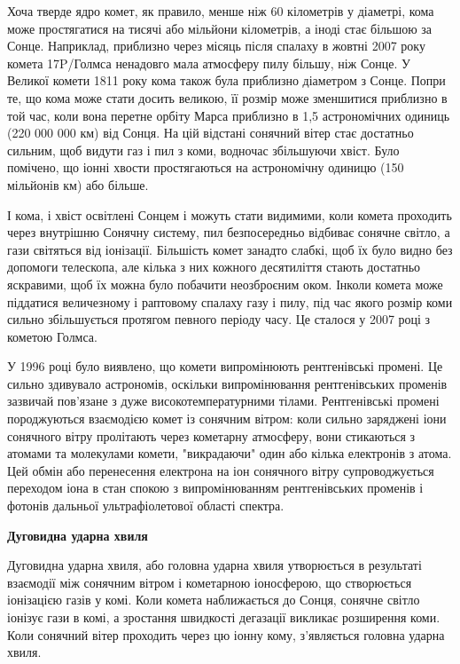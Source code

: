 \documentclass[a4paper]{article}
\begin{document}
    Хоча тверде ядро комет, як правило, менше ніж 60 кілометрів у діаметрі, кома може простягатися на тисячі або мільйони кілометрів, а іноді стає більшою за Сонце. Наприклад, приблизно через місяць після спалаху в жовтні 2007 року комета 17P/Голмса ненадовго мала атмосферу пилу більшу, ніж Сонце. У Великої комети 1811 року кома також була приблизно діаметром з Сонце. Попри те, що кома може стати досить великою, її розмір може зменшитися приблизно в той час, коли вона перетне орбіту Марса приблизно в 1,5 астрономічних одиниць (220 000 000 км) від Сонця. На цій відстані сонячний вітер стає достатньо сильним, щоб видути газ і пил з коми, водночас збільшуючи хвіст. Було помічено, що іонні хвости простягаються на астрономічну одиницю (150 мільйонів км) або більше.
    
    І кома, і хвіст освітлені Сонцем і можуть стати видимими, коли комета проходить через внутрішню Сонячну систему, пил безпосередньо відбиває сонячне світло, а гази світяться від іонізації. Більшість комет занадто слабкі, щоб їх було видно без допомоги телескопа, але кілька з них кожного десятиліття стають достатньо яскравими, щоб їх можна було побачити неозброєним оком. Інколи комета може піддатися величезному і раптовому спалаху газу і пилу, під час якого розмір коми сильно збільшується протягом певного періоду часу. Це сталося у 2007 році з кометою Голмса.
    
    У 1996 році було виявлено, що комети випромінюють рентгенівські промені. Це сильно здивувало астрономів, оскільки випромінювання рентгенівських променів зазвичай пов'язане з дуже високотемпературними тілами. Рентгенівські промені породжуються взаємодією комет із сонячним вітром: коли сильно заряджені іони сонячного вітру пролітають через кометарну атмосферу, вони стикаються з атомами та молекулами комети, "викрадаючи" один або кілька електронів з атома. Цей обмін або перенесення електрона на іон сонячного вітру супроводжується переходом іона в стан спокою з випромінюванням рентгенівських променів і фотонів дальньої ультрафіолетової області спектра.
    
    \textbf{Дуговидна ударна хвиля}
    
    Дуговидна ударна хвиля\cite{18}, або головна ударна хвиля\cite{19} утворюється в результаті взаємодії між сонячним вітром і кометарною іоносферою, що створюється іонізацією газів у комі. Коли комета наближається до Сонця, сонячне світло іонізує гази в комі, а зростання швидкості дегазації викликає розширення коми. Коли сонячний вітер проходить через цю іонну кому, з’являється головна ударна хвиля.
    
\end{document}
